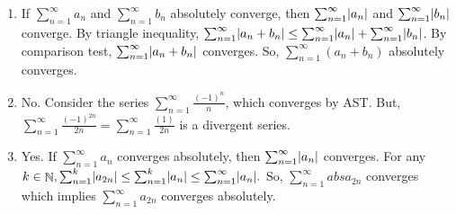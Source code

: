 \documentclass[12pt,letterpaper,boxed]{hmcpset}
\DeclareMathOperator{\N}{\mathbb{N}}
\DeclarePairedDelimiter\abs{\lvert}{\rvert}%
\begin{document}
\begin{solution}
\begin{enumerate}
    \item If $\sum_{n = 1}^{\infty} a_n$ and $\sum_{n = 1}^{\infty} b_n$ absolutely converge, then $\sum_{n = 1}^{\infty} \abs{a_n}$ and $\sum_{n = 1}^{\infty} \abs{b_n}$ converge. By triangle inequality, $\sum_{n = 1}^{\infty} \abs{a_n + b_n} \leq \sum_{n = 1}^{\infty} \abs{a_n} + \sum_{n = 1}^{\infty} \abs{b_n}$. By comparison test, $\sum_{n = 1}^{\infty} \abs{a_n + b_n}$ converges. So, $\sum_{n = 1}^{\infty} (a_n + b_n)$ absolutely converges.
    \item No. Consider the series $\sum_{n=1}^{\infty} \frac{(-1)^{n}}{n}$, which converges by AST. But, $\sum_{n=1}^{\infty} \frac{(-1)^{2n}}{2n}= \sum_{n=1}^{\infty} \frac{(1)}{2n}$ is a divergent series.
    \item Yes. If $\sum_{n = 1}^{\infty} a_n$ converges absolutely, then $\sum_{n = 1}^{\infty} \abs{a_n}$ converges. For any $k\in\N, \sum_{n = 1}^{k} \abs{a_{2n}} \leq \sum_{n = 1}^{k} \abs{a_n} \leq \sum_{n = 1}^{\infty} \abs{a_n}.$ So, $\sum_{n = 1}^{\infty} abs{a_{2n}}$ converges which implies $\sum_{n = 1}^{\infty} a_{2n}$ converges absolutely.
\end{enumerate}
\end{solution}
\end{document}
